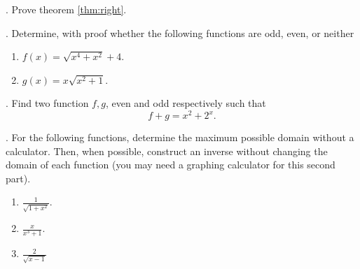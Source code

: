 . Prove theorem \eqref{thm:right}.

. Determine, with proof whether the following functions are odd, even, or neither
\begin{enumerate}[label=\alph*)]
	\item $f(x)=\sqrt{x^4+x^2}+4$.
	\item $g(x)=x\sqrt{x^2+1}$.
\end{enumerate}

. Find two function $f, g$, even and odd respectively such that
$$f+g=x^2+2^x.$$

. For the following functions, determine the maximum possible domain without a calculator.
Then, when possible, construct an inverse without changing the domain of each function (you may need a graphing calculator for this second part).
\begin{enumerate}[label=\alph*)]
	\item $\frac{1}{\sqrt{1+x^2}}$.
	\item $\frac{x}{x^3+1}$.
	\item $\frac{2}{\sqrt{x-1}}$
\end{enumerate}









